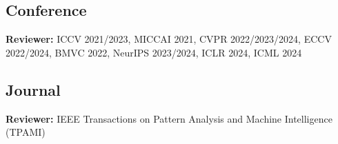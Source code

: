 \documentclass[letterpaper,11pt]{article}
\makeatletter
\newcommand{\resumeItem}[1]{
  \item\small
    {#1 \vspace{-2pt}}
  }
\newcommand{\resumeSubheading}[4]{
  \vspace{-2pt}\item
    \begin{tabular*}{0.97\textwidth}[t]{l@{\extracolsep{\fill}}r}
      \textbf{#1} & #2 \\
      \textit{\small#3} & \textit{\small #4} \\
    \end{tabular*}\vspace{-7pt}
}
\newcommand{\resumeSubHeadingListStart}{\begin{itemize}[leftmargin=0.15in, label={}]}
\newcommand{\resumeSubHeadingListEnd}{\end{itemize}}
\newcommand{\resumeItemListStart}{\begin{itemize}}
\newcommand{\resumeItemListEnd}{\end{itemize}\vspace{-5pt}}
\makeatother
\begin{document}
  \subsection*{Conference}
  \resumeSubHeadingListStart
    \small{\item{
        \textbf{Reviewer: }{ICCV 2021/2023, MICCAI 2021, CVPR 2022/2023/2024, ECCV 2022/2024, BMVC 2022, NeurIPS 2023/2024, ICLR 2024, ICML 2024} \\ \vspace{3pt}
        
    }}
  \resumeSubHeadingListEnd
  \subsection*{Journal}
  \resumeSubHeadingListStart
    \small{\item{
        \textbf{Reviewer: }{IEEE Transactions on Pattern Analysis and Machine Intelligence (TPAMI)}
    }}
  \resumeSubHeadingListEnd


  
    
\end{document}
